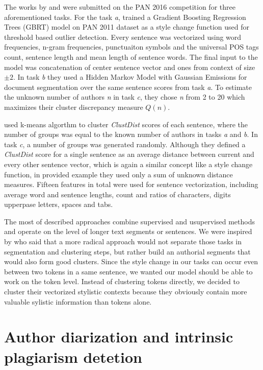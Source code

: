\documentclass[10pt, a4paper]{article}
\begin{document}
The works by \citet{kuznetsov-2016} and \citet{sittar-2016} were submitted on the PAN 2016 competition for three aforementioned tasks. For the task \textit{a}, \citet{kuznetsov-2016} trained a Gradient Boosting Regression Trees (GBRT) model on PAN 2011 dataset as a style change function used for threshold based outlier detection. Every sentence was vectorized using word frequencies, n-gram frequencies, punctuaiton symbols and the universal POS tags count, sentence length and mean length of sentence words. The final input to the model was concatenation of center sentence vector and ones from context of size $\pm2$. In task \textit{b} they used a Hidden Markov Model with Gaussian Emissions for document segmentation over the same sentence scores from task \textit{a}. To estimate the unknown number of authors \textit{n} in task \textit{c}, they chose \textit{n} from 2 to 20 which maximizes their cluster discrepancy measure $Q(n)$.

\citet{sittar-2016} used k-means algorthm to cluster \textit{ClustDist} scores of each sentence, where the number of groups was equal to the known number of authors in tasks \textit{a} and \textit{b}. In task \textit{c}, a number of groups was generated randomly. Although they defined a \textit{ClustDist} score for a single sentence as an average distance between current and every other sentence vector, which is again a similar concept like a style change function, in provided example they used only a sum of unknown distance measures. Fifteen features in total were used for sentence vectorization, including average word and sentence lengths, count and ratios of characters, digits upperpase letters, spaces and tabs. 

The most of described approaches combine supervised and usupervised methods and operate on the level of longer text segments or sentences. We were inspired by \citet{brooke-2013} who said that a more radical approach would not separate those tasks in segmentation and clustering steps, but rather build an authorial segments that would also form good clusters. Since the style change in our tasks can occur even between two tokens in a same sentence, we wanted our model should be able to work on the token level. Instead of clustering tokens directly, we decided to cluster their vectorized stylistic contexts because they obviously contain more valuable sylistic information than tokens alone.

\section{Author diarization and intrinsic plagiarism detetion} \label{sec:author-diraization}
\end{document}
